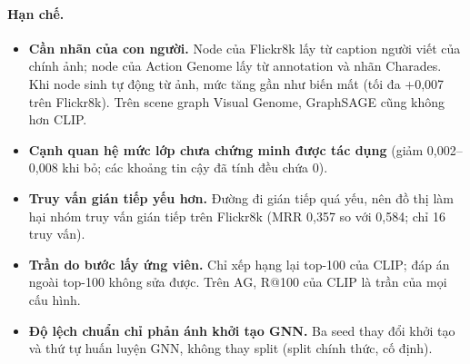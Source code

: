 \documentclass[11pt,a4paper]{article}
\begin{document}
\paragraph{Hạn chế.}
\begin{itemize}
  \item \textbf{Cần nhãn của con người.} Node của Flickr8k lấy từ caption người viết của chính ảnh; node của Action Genome lấy từ annotation và nhãn Charades. Khi node sinh tự động từ ảnh, mức tăng gần như biến mất (tối đa +0,007 trên Flickr8k). Trên scene graph Visual Genome, GraphSAGE cũng không hơn CLIP.
  \item \textbf{Cạnh quan hệ mức lớp chưa chứng minh được tác dụng} (giảm 0,002–0,008 khi bỏ; các khoảng tin cậy đã tính đều chứa 0).
  \item \textbf{Truy vấn gián tiếp yếu hơn.} Đường đi gián tiếp quá yếu, nên đồ thị làm hại nhóm truy vấn gián tiếp trên Flickr8k (MRR 0,357 so với 0,584; chỉ 16 truy vấn).
  \item \textbf{Trần do bước lấy ứng viên.} Chỉ xếp hạng lại top-100 của CLIP; đáp án ngoài top-100 không sửa được. Trên AG, R@100 của CLIP là trần của mọi cấu hình.
  \item \textbf{Độ lệch chuẩn chỉ phản ánh khởi tạo GNN.} Ba seed thay đổi khởi tạo và thứ tự huấn luyện GNN, không thay split (split chính thức, cố định).
\end{itemize}

\sloppy
\end{document}
